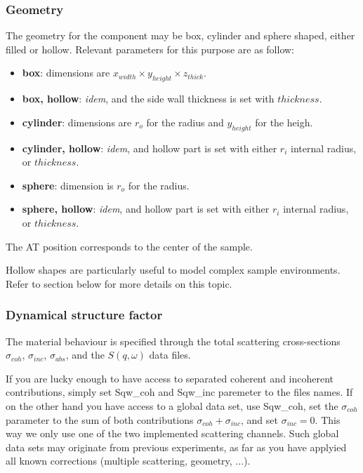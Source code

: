 \subsubsection{Geometry}

The geometry for the component may be box, cylinder and sphere shaped, either filled or hollow. Relevant parameters for this purpose are as follow:
\begin{itemize}
\item {\bf box}: dimensions are $x_{width} \times y_{height} \times z_{thick}$.
\item {\bf box, hollow}: \emph{idem}, and the side wall thickness is set with $thickness$.
\item {\bf cylinder}: dimensions are $r_o$ for the radius and $y_{height}$ for the heigh.
\item {\bf cylinder, hollow}: \emph{idem}, and hollow part is set with either $r_i$ internal radius, or $thickness$.
\item {\bf sphere}: dimension is $r_o$ for the radius.
\item {\bf sphere, hollow}: \emph{idem}, and hollow part is set with either $r_i$ internal radius, or $thickness$.
\end{itemize}
The AT position corresponds to the center of the sample.

Hollow shapes are particularly useful to model complex sample environments. Refer to section below for more details on this topic.

\subsubsection{Dynamical structure factor}

The material behaviour is specified through the total scattering cross-sections $\sigma_{coh}$, $\sigma_{inc}$, $\sigma_{abs}$, and the $S(q, \omega)$ data files.

If you are lucky enough to have access to separated coherent and incoherent contributions, simply set Sqw\_coh and Sqw\_inc paremeter to the files names. If on the other hand you have access to a global data set, use Sqw\_coh, set the $\sigma_{coh}$ parameter to the sum of both contributions $\sigma_{coh}+\sigma_{inc}$, and set $\sigma_{inc}=0$. This way we only use one of the two implemented  scattering channels. Such global data sets may originate from previous experiments, as far as you have applyied all known corrections (multiple scattering, geometry, ...).

